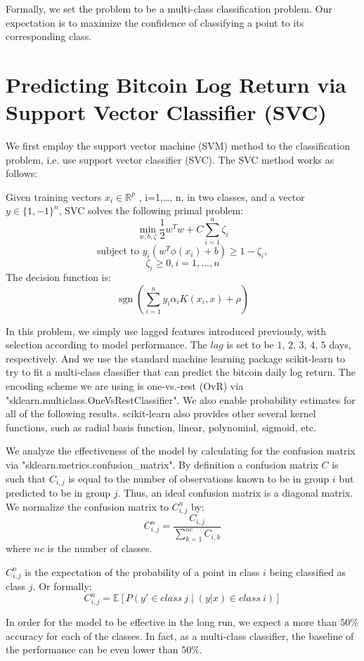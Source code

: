 \documentclass[9pt,twocolumn,twoside]{ilcss}
\begin{document}
Formally, we set the problem to be a multi-class classification problem. Our expectation is to maximize the confidence of classifying a point to its corresponding class.

\section{Predicting Bitcoin Log Return via Support Vector Classifier (SVC)}

We first employ the support vector machine (SVM) method to the classification problem, i.e. use support vector classifier (SVC). The SVC method works as follows:

Given training vectors $x_i \in \mathbb{R}^p$
, i=1,…, n, in two classes, and a vector $y \in \{1, -1\}^n$, SVC solves the following primal problem:
\[\min\limits_{w, b, \zeta} \frac{1}{2} w^T w + C \sum_{i=1}^{n} \zeta_i\]
\[\textrm {subject to } y_i (w^T \phi (x_i) + b) \geq 1 - \zeta_i,\]
\[\zeta_i \geq 0, i=1, ..., n\]
The decision function is:
\[\operatorname{sgn}(\sum_{i=1}^n y_i \alpha_i K(x_i, x) + \rho)\]

In this problem, we simply use lagged features introduced previously, with selection according to model performance. The $lag$ is set to be $1$, $2$, $3$, $4$, $5$ days, respectively. And we use the standard machine learning package scikit-learn to try to fit a multi-class classifier that can predict the bitcoin daily log return. The encoding scheme we are using is one-vs.-rest (OvR) via "sklearn.multiclass.OneVsRestClassifier". We also enable probability estimates for all of the following results. scikit-learn also provides other several kernel functions, such as radial basis function, linear, polynomial, sigmoid, etc.

We analyze the effectiveness of the model by calculating for the confusion matrix via "sklearn.metrics.confusion\_matrix". By definition a confusion matrix $C$ is such that $C_{i,j}$ is equal to the number of observations known to be in group $i$ but predicted to be in group $j$. Thus, an ideal confusion matrix is a diagonal matrix. We normalize the confusion matrix to $C_{i,j}^{n}$ by:
\[ C_{i,j}^{n} = \frac{C_{i,j}}{\sum_{k=1}^{nc}C_{i,k}} \]
where $nc$ is the number of classes.

$C_{i,j}^{n}$ is the expectation of the probability of a point in class $i$ being classified as class $j$. Or formally:
\[
C_{i,j}^{n} = \mathbb{E}[P(y' \in class \: j \;|\; (y|x) \in class \: i)]
\]

In order for the model to be effective in the long run, we expect a more than $50\%$ accuracy for each of the classes. In fact, as a multi-class classifier, the baseline of the performance can be even lower than $50\%$.
\end{document}
